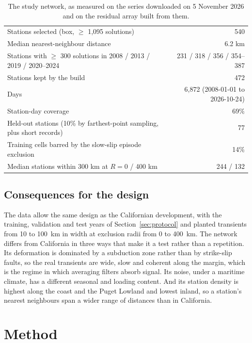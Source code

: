 \documentclass[preprint,12pt,authoryear]{elsarticle}
\begin{document}
\begin{table}[tbp]
  \centering
  \caption{The study network, as measured on the series downloaded on 5 November 2026 and on the residual array built from them.}
  \label{tab:coverage}
  \small
  \begin{tabular}{l r}
    \toprule
    Stations selected (box, $\ge$ 1,095 solutions) & 540 \\
    Median nearest-neighbour distance & 6.2 km \\
    Stations with $\ge$ 300 solutions in 2008 / 2013 / 2019 / 2020--2024 & 231 / 318 / 356 / 354--387 \\
    Stations kept by the build & 472 \\
    Days & 6,872 (2008-01-01 to 2026-10-24) \\
    Station-day coverage & 69\% \\
    Held-out stations (10\% by farthest-point sampling, plus short records) & 77 \\
    Training cells barred by the slow-slip episode exclusion & 14\% \\
    Median stations within 300 km at $R = 0$ / 400 km & 244 / 132 \\
    \bottomrule
  \end{tabular}
\end{table}

\subsection{Consequences for the design}

The data allow the same design as the Californian development, with the training, validation and test years of Section~\ref{sec:protocol} and planted transients from 10 to 100~km in width at exclusion radii from 0 to 400~km. The network differs from California in three ways that make it a test rather than a repetition. Its deformation is dominated by a subduction zone rather than by strike-slip faults, so the real transients are wide, slow and coherent along the margin, which is the regime in which averaging filters absorb signal. Its noise, under a maritime climate, has a different seasonal and loading content. And its station density is highest along the coast and the Puget Lowland and lowest inland, so a station's nearest neighbours span a wider range of distances than in California.

\section{Method}
\label{sec:method}
\end{document}
